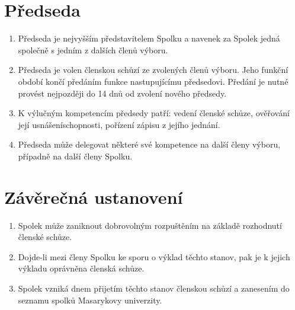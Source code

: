 \documentclass[11pt,a4paper]{article}
\begin{document}
\section{Předseda}
\begin{enumerate}[itemsep=0pt]
    \item Předseda je nejvyšším představitelem Spolku a navenek 
    za Spolek jedná společně s jedním z dalších členů výboru.  
    \item Předseda je volen členskou schůzí ze zvolených členů výboru. 
    Jeho funkční období končí předáním funkce nastupujícímu předsedovi. 
    Předání je nutné provést nejpozději do 14 dnů od zvolení nového předsedy. 
    \item K výlučným kompetencím předsedy patří: vedení členské schůze, 
    ověřování její usnášeníschopnosti, pořízení zápisu z jejího jednání.
    \item Předseda může delegovat některé své kompetence na další členy výboru, 
    případně na další členy Spolku.
\end{enumerate}

\section{Závěrečná ustanovení}
\begin{enumerate}[itemsep=0pt]
    \item Spolek může zaniknout dobrovolným rozpuštěním na základě rozhodnutí
    členské schůze.
    \item Dojde-li mezi členy Spolku ke sporu o výklad těchto stanov, pak je 
    k jejich výkladu oprávněna členská schůze.
    \item Spolek vzniká dnem přijetím těchto stanov členskou schůzí a zanesením 
    do seznamu spolků Masarykovy univerzity.
\end{enumerate}
\end{document}
